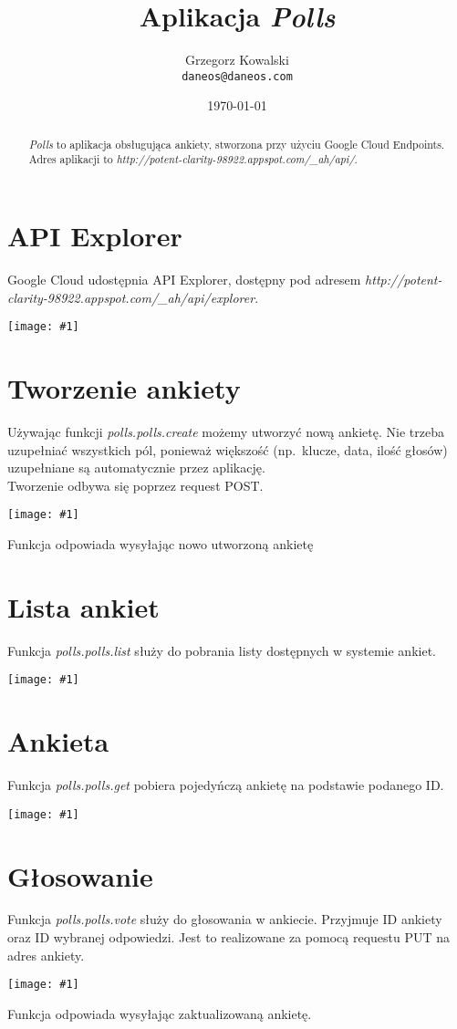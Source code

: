 \documentclass[12pt,a4paper]{article}
\title{Aplikacja \emph{Polls}}
\author{Grzegorz Kowalski\\\texttt{daneos@daneos.com}}
\date{\today}
\newcommand{\screenshot}[1]{\\\begin{minipage}[c]{\textwidth}\hspace{0em}\texttt{[image: \#1]}\end{minipage}\vspace{0em}}
\newcommand{\adres}[1]{\emph{http://potent-clarity-98922.appspot.com/\_ah/api/#1}}
\begin{document}
\maketitle

\begin{abstract}
\emph{Polls} to aplikacja obsługująca ankiety, stworzona przy użyciu Google Cloud Endpoints.\\
Adres aplikacji to \adres{}.
\end{abstract}

\section{API Explorer}
Google Cloud udostępnia API Explorer, dostępny pod adresem \adres{explorer}.
\screenshot{api_list.png}

\section{Tworzenie ankiety}
Używając funkcji \emph{polls.polls.create} możemy utworzyć nową ankietę. Nie trzeba uzupełniać wszystkich pól, ponieważ większość (np.~klucze, data, ilość głosów) uzupełniane są automatycznie przez aplikację.\\
Tworzenie odbywa się poprzez request POST.
\screenshot{new_poll.png}
Funkcja odpowiada wysyłając nowo utworzoną ankietę

\section{Lista ankiet}
Funkcja \emph{polls.polls.list} służy do pobrania listy dostępnych w systemie ankiet.
\screenshot{poll_list.png}

\section{Ankieta}
Funkcja \emph{polls.polls.get} pobiera pojedyńczą ankietę na podstawie podanego ID.
\screenshot{poll.png}

\section{Głosowanie}
Funkcja \emph{polls.polls.vote} służy do głosowania w ankiecie. Przyjmuje ID ankiety oraz ID wybranej odpowiedzi.
Jest to realizowane za pomocą requestu PUT na adres ankiety.
\screenshot{vote.png}
Funkcja odpowiada wysyłając zaktualizowaną ankietę.
\end{document}
